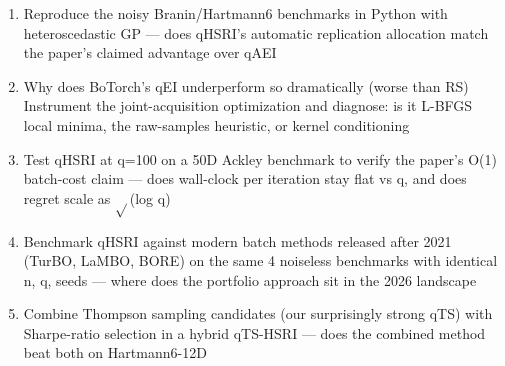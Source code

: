 \begin{enumerate}[leftmargin=1.6em,itemsep=0.2em,topsep=0.2em,label=Q\arabic*.]
\item Reproduce the noisy Branin/Hartmann6 benchmarks in Python with heteroscedastic GP --- does qHSRI's automatic replication allocation match the paper's claimed advantage over qAEI
\item Why does BoTorch's qEI underperform so dramatically (worse than RS) Instrument the joint-acquisition optimization and diagnose: is it L-BFGS local minima, the raw-samples heuristic, or kernel conditioning
\item Test qHSRI at q=100 on a 50D Ackley benchmark to verify the paper's O(1) batch-cost claim --- does wall-clock per iteration stay flat vs q, and does regret scale as $\sqrt{}$(log q)
\item Benchmark qHSRI against modern batch methods released after 2021 (TurBO, LaMBO, BORE) on the same 4 noiseless benchmarks with identical n, q, seeds --- where does the portfolio approach sit in the 2026 landscape
\item Combine Thompson sampling candidates (our surprisingly strong qTS) with Sharpe-ratio selection in a hybrid qTS-HSRI --- does the combined method beat both on Hartmann6-12D
\end{enumerate}

